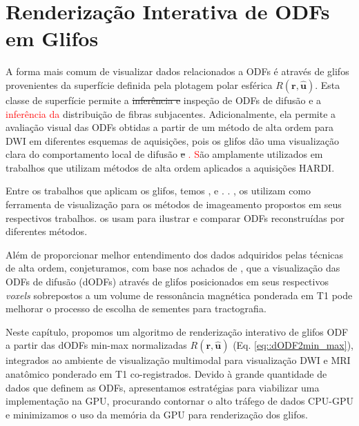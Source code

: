 \chapter{Renderização Interativa de \difusao ODFs em Glifos}
\label{chap::renderizacao_interativa_de_perfis_de_difusao}


A forma mais comum de visualizar dados relacionados a ODFs é através de glifos provenientes da superfície definida pela plotagem polar esférica $R(\mathbf{r} , \mathbf{\hat{u}})$. Esta classe de superfície permite a \sout{inferência e} inspeção de ODFs de difusão e a \textcolor{red}{inferência da} distribuição de fibras subjacentes. Adicionalmente, ela permite a avaliação visual das ODFs obtidas a partir de um método de alta ordem para DWI em diferentes esquemas de aquisições, pois os glifos dão uma visualização clara do comportamento local de difusão\sout{ e }\textcolor{red}{. S}ão amplamente utilizados em trabalhos que utilizam métodos de alta ordem aplicados a aquisições HARDI.

Entre os trabalhos que aplicam os glifos, temos ,   e  .  . ,   os utilizam como ferramenta de visualização para os métodos de imageamento propostos em seus respectivos trabalhos.  os usam para ilustrar e comparar ODFs reconstruídas por diferentes métodos.


Além de proporcionar melhor entendimento dos dados adquiridos pelas técnicas de alta ordem, conjeturamos, com base nos achados de , que a visualização das ODFs de difusão (dODFs) através de glifos posicionados em seus respectivos \textit{voxels} sobrepostos a um volume de ressonância magnética ponderada em T1 pode melhorar o processo de escolha de sementes para tractografia.

Neste capítulo, propomos um algoritmo de renderização 
interativo de glifos ODF a partir das dODFs min-max normalizadas $R(\mathbf{r}, \mathbf{\mathbf{\hat{u}}})$ (Eq. \ref{eq::dODF2min_max}), integrados ao ambiente de visualização multimodal para visualização DWI e MRI anatômico ponderado em T1 co-registrados. Devido à grande quantidade de dados que definem as ODFs, apresentamos estratégias para viabilizar uma implementação na GPU, procurando contornar o alto tráfego de dados CPU-GPU e minimizamos o uso da memória da GPU para renderização dos glifos.

